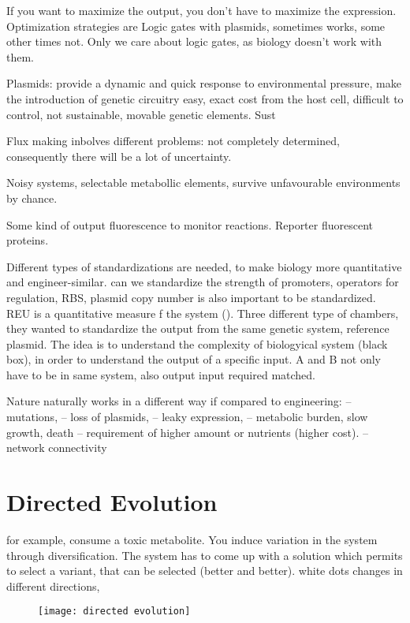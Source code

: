 
If you want to maximize the output, you don't have to maximize the expression. Optimization strategies are
Logic gates with plasmids, sometimes works, some other times not. Only we care about logic gates, as biology doesn't work with them. 

Plasmids:
provide a dynamic and quick
response to environmental pressure, make the introduction of genetic circuitry
easy,
exact cost from the host cell, difficult to control, not sustainable,
movable genetic elements. 
Sust


Flux making inbolves different problems: not completely determined, consequently there will be a lot of uncertainty. 


Noisy systems, selectable metabollic elements, survive unfavourable environments by chance. 

Some kind of output fluorescence to monitor reactions. Reporter fluorescent proteins. 



Different types of standardizations are needed, to make biology more quantitative and engineer-similar.
can we standardize the strength of promoters, operators for regulation, RBS, plasmid copy number is also important to be standardized. \\
REU is a quantitative measure f the system (). Three different type of chambers, they wanted to standardize the output from the same genetic system, reference plasmid. 
The idea is to understand the complexity of biologyical system (black box), in order to understand the output of a specific input.
A and B not only have to be in same system, also output input required matched. 

Nature naturally works in a different way if compared to engineering:
– mutations,
– loss of plasmids,
– leaky expression,
– metabolic burden, slow growth, death
– requirement of higher amount or nutrients
(higher cost).
– network connectivity

\section{Directed Evolution}
for example, consume a toxic metabolite. You induce variation in the system through diversification. The system has to come up with a solution which permits to select a variant, that can be selected (better and better). white dots changes in different directions, 

\begin{figure}[h]
\caption{}
\centering
\texttt{[image: directed evolution]}
\label{}
\end{figure}

